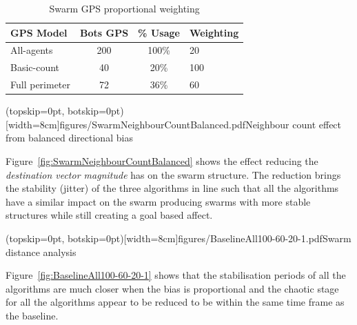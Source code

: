 \documentclass{ieeeaccess}
\begin{document}
\begin{table}
\begin{center}
\begin{tabular}{| l | c | c | l |}
\hline
GPS Model & Bots GPS & \% Usage & Weighting \\ \hline
All-agents & 200 & 100\% & 20 \\ \hline
Basic-count & 40 & 20\% & 100 \\ \hline
Full perimeter & 72 & 36\% & 60 \\  \hline
\end{tabular}\caption{Swarm GPS proportional weighting}\label{tab:GPSWeighting}
\end{center}
\end{table}


\Figure[t!](topskip=0pt, botskip=0pt)[width=8cm]{figures/SwarmNeighbourCountBalanced.pdf}{Neighbour count effect from balanced directional bias\label{fig:SwarmNeighbourCountBalanced}}

Figure~\ref{fig:SwarmNeighbourCountBalanced} shows the effect reducing the \textit{destination vector magnitude} has on the swarm structure. The reduction brings the stability (jitter) of the three algorithms in line such that all the algorithms have a similar impact on the swarm producing swarms with more stable structures while still creating a goal based affect. 


\Figure[t!](topskip=0pt, botskip=0pt)[width=8cm]{figures/BaselineAll100-60-20-1.pdf}{Swarm distance analysis\label{fig:BaselineAll100-60-20-1}}

Figure~\ref{fig:BaselineAll100-60-20-1} shows that the stabilisation periods of all the algorithms are much closer when the bias is proportional and the chaotic stage for all the algorithms appear to be reduced to be within the same time frame as the baseline.
\end{document}
